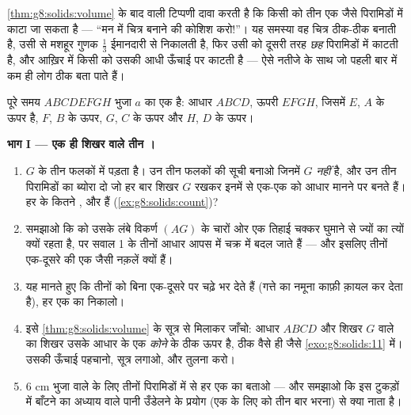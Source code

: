 \begin{problem}
\label{pb:g8:solids:1}
\cref{thm:g8:solids:volume} के बाद वाली टिप्पणी दावा करती है कि किसी
 को तीन एक जैसे पिरामिडों में काटा जा सकता है --- ``मन में चित्र
बनाने की कोशिश करो!''। यह समस्या वह चित्र ठीक-ठीक बनाती है, उसी से
मशहूर गुणक $\frac13$ ईमानदारी से निकालती है, फिर उसी  को दूसरी तरह
\emph{छह} पिरामिडों में काटती है, और आख़िर में किसी  को उसकी
आधी ऊँचाई पर काटती है --- ऐसे नतीजे के साथ जो पहली बार में कम ही लोग
ठीक बता पाते हैं।

पूरे समय $ABCDEFGH$ भुजा $a$ का एक  है: आधार $ABCD$, ऊपरी 
$EFGH$, जिसमें $E$, $A$ के ऊपर है, $F$, $B$ के ऊपर, $G$, $C$ के ऊपर
और $H$, $D$ के ऊपर।

\medskip
\noindent\textbf{भाग I --- एक ही शिखर वाले तीन ।}
\begin{enumerate}
  \item {} $G$  के तीन फलकों में पड़ता है। उन तीन फलकों की सूची
        बनाओ जिनमें $G$ \emph{नहीं} है, और उन तीन पिरामिडों का
        ब्योरा दो जो हर बार शिखर $G$ रखकर इनमें से एक-एक को आधार
        मानने पर बनते हैं। हर  के कितने ,  और 
        हैं (\cref{ex:g8:solids:count})?
  \item समझाओ कि  को उसके लंबे विकर्ण $(AG)$ के चारों ओर एक तिहाई
        चक्कर घुमाने से  ज्यों का त्यों क्यों रहता है, पर सवाल 1
        के तीनों आधार आपस में चक्र में बदल जाते हैं --- और इसलिए
        तीनों  एक-दूसरे की एक जैसी नक़लें क्यों हैं।
  \item यह मानते हुए कि तीनों   को बिना एक-दूसरे पर चढ़े भर
        देते हैं (गत्ते का नमूना काफ़ी क़ायल कर देता है), हर एक का
         निकालो।
  \item इसे \cref{thm:g8:solids:volume} के सूत्र से मिलाकर जाँचो:
        आधार $ABCD$ और शिखर $G$ वाले  का शिखर उसके आधार के
        एक \emph{कोने} के ठीक ऊपर है, ठीक वैसे ही जैसे
        \cref{exo:g8:solids:11} में। उसकी ऊँचाई पहचानो, सूत्र
        लगाओ, और तुलना करो।
  \item $6$ cm भुजा वाले  के लिए तीनों पिरामिडों में से हर एक का
         बताओ --- और समझाओ कि इस टुकड़ों में बाँटने का अध्याय
        वाले पानी उँडेलने के प्रयोग (एक  के लिए  को
        तीन बार भरना) से क्या नाता है।
\end{enumerate}


\end{problem}
